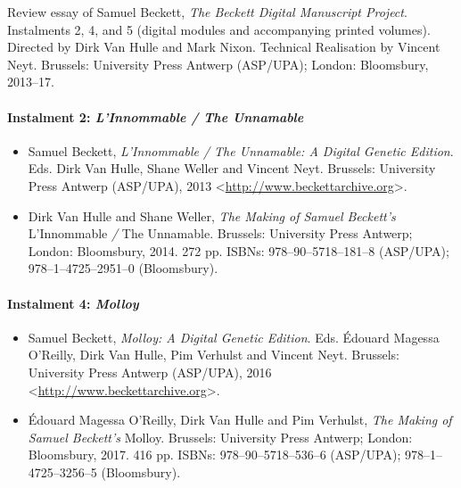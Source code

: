 


\begin{paper}
\renewcommand*{\pagemark}{}


\begin{reviewed}

Review essay of Samuel Beckett, \emph{The Beckett Digital Manuscript Project}. Instalments 2, 4, and 5 (digital modules and accompanying printed volumes). Directed by Dirk Van Hulle and Mark Nixon. Technical Realisation by Vincent Neyt. Brussels: University Press Antwerp (ASP/UPA); London: Bloomsbury, 2013--17. 

\paragraph{\footnotesize Instalment 2: \emph{L'Innommable / The Unnamable}}
    \begin{itemize}
        \item Samuel Beckett, \emph{\emph{L'Innommable / The Unnamable}: A Digital Genetic
Edition}. Eds. Dirk Van Hulle, Shane Weller and Vincent Neyt. Brussels:
University Press Antwerp (ASP/UPA), 2013\newline
\textless{}\url{http://www.beckettarchive.org}\textgreater.
        \item Dirk Van Hulle and Shane Weller, \emph{The Making of Samuel Beckett's}
L'Innommable \emph{/} The Unnamable. Brussels: University Press Antwerp;
London: Bloomsbury, 2014. 272 pp. ISBNs: 978--90--5718--181--8 (ASP/UPA);
978--1--4725--2951--0 (Bloomsbury).
    \end{itemize}
\paragraph{\footnotesize Instalment 4: \emph{Molloy}}
    \begin{itemize}
        \item Samuel Beckett, \emph{\emph{Molloy}: A Digital Genetic Edition}. Eds. Édouard Magessa
O'Reilly, Dirk Van Hulle, Pim Verhulst and Vincent Neyt. Brussels:
University Press Antwerp (ASP/UPA), 2016\newline
\textless{}\url{http://www.beckettarchive.org}\textgreater.
        \item Édouard Magessa O'Reilly, Dirk Van Hulle and Pim Verhulst, \emph{The
Making of Samuel Beckett's} Molloy. Brussels: University Press Antwerp;
London: Bloomsbury, 2017. 416 pp. ISBNs: 978--90--5718--536--6 (ASP/UPA);
978--1--4725--3256--5 (Bloomsbury).
    \end{itemize}

\end{reviewed}
\end{paper}
